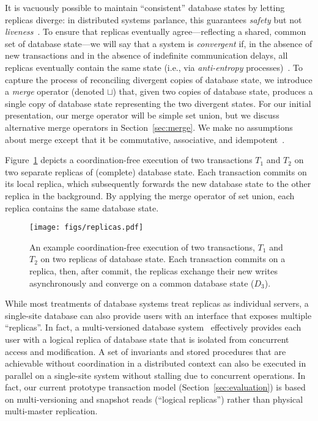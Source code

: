 It is vacuously possible to maintain ``consistent'' database states by
letting replicas diverge: in distributed systems parlance, this
guarantees \textit{safety} but not
\textit{liveness}~\cite{lamport-safety}. To ensure that replicas
eventually agree---reflecting a shared, common set of database
state---we will say that a system is \textit{convergent} if, in the
absence of new transactions and in the absence of indefinite
communication delays, all replicas eventually contain the same state
(i.e., via \textit{anti-entropy} processes)~\cite{vogels-defs}. To
capture the process of reconciling divergent copies of database state,
we introduce a \textit{merge} operator (denoted $\sqcup$) that, given
two copies of database state, produces a single copy of database state
representing the two divergent states. For our initial presentation,
our merge operator will be simple set union, but we discuss
alternative merge operators in Section~\ref{sec:merge}. We make no
assumptions about merge except that it be commutative, associative,
and idempotent~\cite{calm,crdt}.

Figure~\ref{fig:replicas} depicts a coordination-free execution of two
transactions $T_1$ and $T_2$ on two separate replicas of (complete)
database state. Each transaction commits on its local replica, which
subsequently forwards the new database state to the other replica in
the background. By applying the merge operator of set union, each
replica contains the same database state.

\begin{figure}
\begin{center}
\texttt{[image: figs/replicas.pdf]}
\end{center}
\caption{An example coordination-free execution of two transactions,
  $T_1$ and $T_2$ on two replicas of database state. Each transaction
  commits on a replica, then, after commit, the replicas exchange
  their new writes asynchronously and converge on a common database
  state ($D_3$).}
\label{fig:replicas}
\end{figure}

 While most treatments
of database systems treat replicas as individual servers, a
single-site database can also provide users with an interface that
exposes multiple ``replicas''. In fact, a multi-versioned database
system~\cite{bernstein-book} effectively provides each user with a
logical replica of database state that is isolated from concurrent
access and modification. A set of invariants and stored procedures
that are achievable without coordination in a distributed context can
also be executed in parallel on a single-site system without stalling
due to concurrent operations.  In fact, our current prototype
transaction model (Section~\ref{sec:evaluation}) is based on
multi-versioning and snapshot reads (``logical replicas'') rather than
physical multi-master replication.
